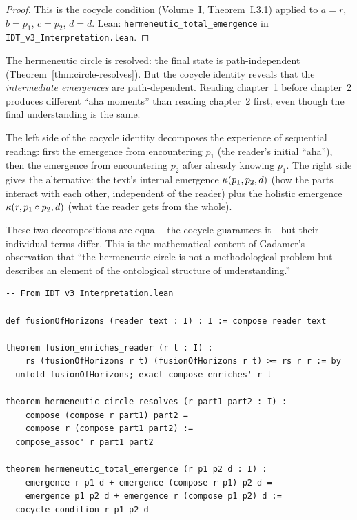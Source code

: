 \begin{proof}
This is the cocycle condition (Volume~I, Theorem~I.3.1) applied to
$a = r$, $b = p_1$, $c = p_2$, $d = d$.
Lean: \texttt{hermeneutic\_total\_emergence} in \texttt{IDT\_v3\_Interpretation.lean}.
\end{proof}

\begin{interpretation}
\label{interp:journey-matters}
The hermeneutic circle is resolved: the final state is path-independent
(Theorem~\ref{thm:circle-resolves}). But the cocycle identity reveals that
the \emph{intermediate emergences} are path-dependent. Reading chapter~1 before
chapter~2 produces different ``aha moments'' than reading chapter~2 first,
even though the final understanding is the same.

The left side of the cocycle identity decomposes the experience of sequential
reading: first the emergence from encountering $p_1$ (the reader's initial
``aha''), then the emergence from encountering $p_2$ after already knowing $p_1$.
The right side gives the alternative: the text's internal emergence
$\kappa(p_1, p_2, d)$ (how the parts interact with each other, independent
of the reader) plus the holistic emergence $\kappa(r, p_1 \circ p_2, d)$
(what the reader gets from the whole).

These two decompositions are equal---the cocycle guarantees it---but their
individual terms differ. This is the mathematical content of Gadamer's
observation that ``the hermeneutic circle is not a methodological problem
but describes an element of the ontological structure of understanding.''
\end{interpretation}

\begin{lstlisting}
-- From IDT_v3_Interpretation.lean

def fusionOfHorizons (reader text : I) : I := compose reader text

theorem fusion_enriches_reader (r t : I) :
    rs (fusionOfHorizons r t) (fusionOfHorizons r t) >= rs r r := by
  unfold fusionOfHorizons; exact compose_enriches' r t

theorem hermeneutic_circle_resolves (r part1 part2 : I) :
    compose (compose r part1) part2 =
    compose r (compose part1 part2) :=
  compose_assoc' r part1 part2

theorem hermeneutic_total_emergence (r p1 p2 d : I) :
    emergence r p1 d + emergence (compose r p1) p2 d =
    emergence p1 p2 d + emergence r (compose p1 p2) d :=
  cocycle_condition r p1 p2 d
\end{lstlisting}

